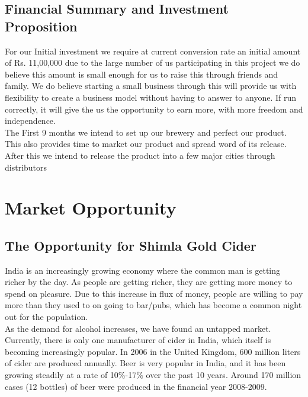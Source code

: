 \documentclass[11pt]{article}
\begin{document}
  \subsection{Financial Summary and Investment Proposition}
     For our Initial investment we require at current conversion rate an initial amount of Rs. 11,00,000 due to the large number of us participating in this project we do believe this amount is small enough for us to raise this through friends and family. We do believe starting a small business through this will provide us with flexibility to create a business model without having to answer to anyone. If run correctly, it will give the us the opportunity to earn more, with more freedom and independence.\\
     The First 9 months we intend to set up our brewery and perfect our product. This also provides time to market our product and spread word of its release. After this we intend to release the product into a few major cities through distributors

\newpage
\section{Market Opportunity}
  \subsection{The Opportunity for Shimla Gold Cider}

India is an increasingly growing economy where the common man is getting richer by the day. As people are getting richer, they are getting more money to spend on pleasure. Due to this increase in flux of money, people are willing to pay more than they used to on going to bar/pubs, which has become a common night out for the population. \\

\noindent As the demand for alcohol increases, we have found an untapped market. Currently, there is only one manufacturer of cider in India, which itself is becoming increasingly popular. In 2006 in the United Kingdom, 600 million liters of cider are produced annually. Beer is very popular in India, and it has been growing steadily at a rate of 10\%-17\% over the past 10 years. Around 170 million cases (12 bottles) of beer were produced in the financial year 2008-2009. \\
\end{document}
